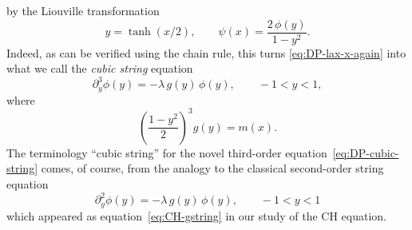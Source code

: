 \documentclass[10pt,a4paper]{article} \pdfoutput=1 
\begin{document}
by the Liouville transformation
\begin{equation}
  \label{eq:DP-liouville-trf}
  y = \tanh(x/2)
  , \qquad
  \psi(x) = \frac{2\,\phi(y)}{1-y^2}
  .
\end{equation}
Indeed,
as can be verified using the chain rule,
this turns \eqref{eq:DP-lax-x-again}
into what we call the \emph{cubic string} equation
\begin{equation}
  \label{eq:DP-cubic-string}
  \partial_y^3 \phi(y) = -\lambda \, g(y) \, \phi(y)
  ,\qquad
  -1<y<1
  ,
\end{equation}
where
\begin{equation}
  \label{eq:DP-gm}
  \left( \frac{1-y^2}{2} \right)^3 g(y) = m(x)
  .
\end{equation}
The terminology ``cubic string''
for the novel third-order equation~\eqref{eq:DP-cubic-string}
comes, of course, from the analogy to the classical second-order string equation
\begin{equation*}
  \partial_y^2 \phi(y) = -\lambda \, g(y) \, \phi(y)
  ,\qquad
  -1<y<1
\end{equation*}
which appeared as equation~\eqref{eq:CH-gstring} in our study of the CH equation.
\end{document}
